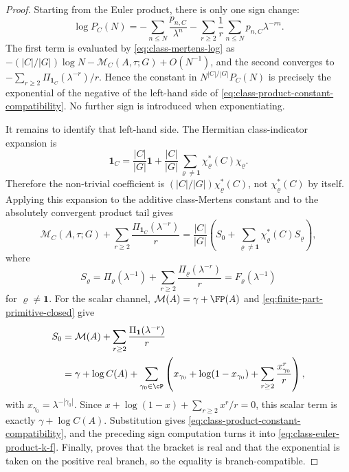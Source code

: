 \begin{proof}
  Starting from the Euler product, there is only one sign change:
  \[
    \log P_C(N)
    =-
    \sum_{n\le N}\frac{p_{n,C}}{\lambda^n}
    -
    \sum_{r\ge2}\frac1r\sum_{n\le N}p_{n,C}\lambda^{-rn}.
  \]
  The first term is evaluated by
  \eqref{eq:class-mertens-log} as
  \(-(|C|/|G|)\log N-\mathcal M_C(A,\tau;G)+O(N^{-1})\), and the second
  converges to
  \(-\sum_{r\ge2}\Pi_{\mathbf1_C}(\lambda^{-r})/r\).  Hence the constant in
  \(N^{|C|/|G|}P_C(N)\) is precisely the exponential of the negative of the
  left-hand side of
  \eqref{eq:class-product-constant-compatibility}.  No further sign is
  introduced when exponentiating.

  It remains to identify that left-hand side.  The Hermitian class-indicator
  expansion is
  \[
    \mathbf1_C=\frac{|C|}{|G|}\mathbf1+\frac{|C|}{|G|}
      \sum_{\varrho\ne\mathbf1}\chi_\varrho^\ast(C)\chi_\varrho .
  \]
  Therefore the non-trivial coefficient is
  \((|C|/|G|)\chi_\varrho^\ast(C)\), not
  \(\chi_\varrho^\ast(C)\) by itself.  Applying this expansion to the
  additive class-Mertens constant and to the absolutely convergent product
  tail gives
  \[
    \mathcal M_C(A,\tau;G)+
    \sum_{r\ge2}\frac{\Pi_{\mathbf1_C}(\lambda^{-r})}{r}
    =
    \frac{|C|}{|G|}\left(S_0+
      \sum_{\varrho\ne\mathbf1}\chi_\varrho^\ast(C)S_\varrho\right),
  \]
  where
  \[
    S_\varrho=
    \Pi_\varrho(\lambda^{-1})+
    \sum_{r\ge2}\frac{\Pi_\varrho(\lambda^{-r})}{r}
    =F_\varrho(\lambda^{-1})
  \]
  for \(\varrho\ne\mathbf1\).  For the scalar channel,
  \(\mathcal M(A)=\gamma+\FP(A)\) and
  \eqref{eq:finite-part-primitive-closed} give
  \[
  \begin{aligned}
    S_0
    &=
    \mathcal M(A)+\sum_{r\ge2}\frac{\Pi_{\mathbf1}(\lambda^{-r})}{r} \\
    &=\gamma+
      \log C(A)+
      \sum_{\gamma_0\in\cP}
      \left(
        x_{\gamma_0}+\log(1-x_{\gamma_0})+
        \sum_{r\ge2}\frac{x_{\gamma_0}^r}{r}
      \right),
  \end{aligned}
  \]
  with \(x_{\gamma_0}=\lambda^{-|\gamma_0|}\).  Since
  \(x+
  \log(1-x)+\sum_{r\ge2}x^r/r=0\), this scalar term is exactly
  \(\gamma+\log C(A)\).  Substitution gives
  \eqref{eq:class-product-constant-compatibility}, and the preceding sign
  computation turns it into \eqref{eq:class-euler-product-k-f}.  Finally,
   proves that the bracket is
  real and that the exponential is taken on the positive real branch, so the
  equality is branch-compatible.
\end{proof}

